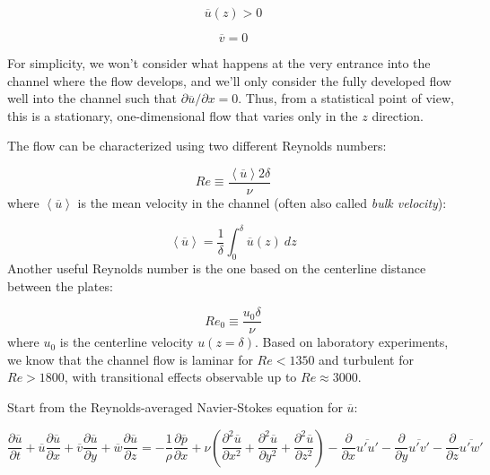 \documentclass[12pt]{article}
\numberwithin{equation}{section}
\numberwithin{figure}{section}
\numberwithin{table}{section}
\begin{document}
\begin{equation}
  \overline{u}(z) > 0
\end{equation}

\begin{equation}
  \overline{v} = 0
\end{equation}

For simplicity, we won't consider what happens at the very entrance into the
channel where the flow develops, and we'll only consider the fully developed
flow well into the channel such that $\partial \overline{u}/\partial x = 0$.
Thus, from a statistical point of view, this is a stationary, one-dimensional
flow that varies only in the $z$ direction.

The flow can be characterized using two different Reynolds numbers:

\begin{equation}
  Re \equiv \frac{\left<\overline{u}\right> 2 \delta}{\nu}
\end{equation}
where $\left<\overline{u}\right>$ is the mean velocity in the channel (often also called
\textit{bulk velocity}):

\begin{equation}
  \left< \overline{u}\right> = \frac{1}{\delta} \int_0^{\delta} \overline{u}(z)\ dz
  \label{eq:bulk_velocity}
\end{equation}
Another useful Reynolds number is the one based on the centerline distance
between the plates:

\begin{equation}
  Re_0 \equiv \frac{u_0 \delta}{\nu}
\end{equation}
where $u_0$ is the centerline velocity $u(z=\delta)$.
Based on laboratory experiments, we know that the channel flow is laminar
for $Re < 1350$ and turbulent for $Re > 1800$, with transitional effects
observable up to $Re \approx 3000$.

Start from the Reynolds-averaged Navier-Stokes equation for $\overline{u}$:

\begin{equation}
  \frac{\partial \overline{u}}{\partial t} + 
  \overline{u} \frac{\partial \overline{u}}{\partial x} + 
  \overline{v} \frac{\partial \overline{u}}{\partial y} + 
  \overline{w} \frac{\partial \overline{u}}{\partial z} =
  - \frac{1}{\rho} \frac{\partial \overline{p}}{\partial x} +
  \nu \left( \frac{\partial^2 \overline{u}}{\partial x^2} +
  \frac{\partial^2 \overline{u}}{\partial y^2} +
  \frac{\partial^2 \overline{u}}{\partial z^2} \right)
  - \frac{\partial}{\partial x}\overline{u'u'}
  - \frac{\partial}{\partial y}\overline{u'v'}
  - \frac{\partial}{\partial z}\overline{u'w'}
  \label{eq:channel_ns_u1}
\end{equation}
\end{document}
